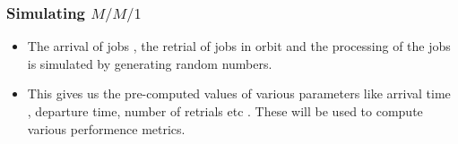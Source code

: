 \documentclass{beamer}
\def \mp {\pause}
\def \mp {}
\newcommand{\ft}[1]{\frametitle{#1}}
\begin{document}
\begin{frame}
 \ft{Simulating $M/M/1$}
\begin{itemize}\setlength\itemsep{.8em}

\mp \item The arrival of jobs , the retrial of jobs in orbit and the processing of the jobs is simulated by generating random numbers.

\mp \item This gives us the pre-computed values of various parameters like arrival time , departure time, number of retrials etc . These will be used to compute various performence metrics.



\end{itemize}
\end{frame}
\end{document}
